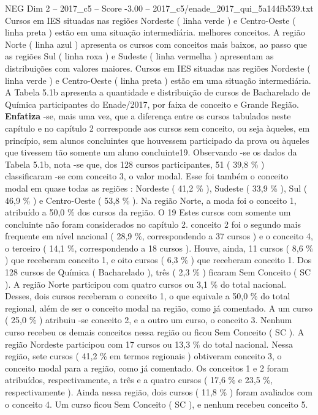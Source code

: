 \begin{textsample}{NEG Dim 2 – 2017\_c5 – Score -3.00 – 2017\_c5/enade\_2017\_qui\_5a144fb539.txt}
Cursos em IES situadas nas regiões Nordeste ( linha verde ) e Centro-Oeste ( linha preta ) estão em uma situação intermediária. melhores conceitos.
A região Norte ( linha azul ) apresenta os cursos com conceitos mais baixos, ao passo que as regiões Sul ( linha roxa ) e Sudeste ( linha vermelha ) apresentam as distribuições com valores maiores.
Cursos em IES situadas nas regiões Nordeste ( linha verde ) e Centro-Oeste ( linha preta ) estão em uma situação intermediária.
A Tabela 5.1b apresenta a quantidade e distribuição de cursos de Bacharelado de Química participantes do Enade/2017, por faixa de conceito e Grande Região. \textbf{Enfatiza} -se, mais uma vez, que a diferença entre os cursos tabulados neste capítulo e no capítulo 2 corresponde aos cursos sem conceito, ou seja àqueles, em princípio, sem alunos concluintes que houvessem participado da prova ou àqueles que tivessem tão somente um aluno concluinte19.
Observando -se os dados da Tabela 5.1b, nota -se que, dos 128 cursos participantes, 51 ( 39,8 \% ) classificaram -se com conceito 3, o valor modal.
Esse foi também o conceito modal em quase todas as regiões : Nordeste ( 41,2 \% ), Sudeste ( 33,9 \% ), Sul ( 46,9 \% ) e Centro-Oeste ( 53,8 \% ).
Na região Norte, a moda foi o conceito 1, atribuído a 50,0 \% dos cursos da região.
O 19 Estes cursos com somente um concluinte não foram considerados no capítulo 2. conceito 2 foi o segundo mais frequente em nível nacional ( 28,9 \%, correspondendo a 37 cursos ) e o conceito 4, o terceiro ( 14,1 \%, correspondendo a 18 cursos ).
Houve, ainda, 11 cursos ( 8,6 \% ) que receberam conceito 1, e oito cursos ( 6,3 \% ) que receberam conceito 1.
Dos 128 cursos de Química ( Bacharelado ), três ( 2,3 \% ) ficaram Sem Conceito ( SC ).
A região Norte participou com quatro cursos ou 3,1 \% do total nacional.
Desses, dois cursos receberam o conceito 1, o que equivale a 50,0 \% do total regional, além de ser o conceito modal na região, como já comentado.
A um curso ( 25,0 \% ) atribuiu -se conceito 2, e a outro um curso, o conceito 3.
Nenhum curso recebeu os demais conceitos nessa região ou ficou Sem Conceito ( SC ).
A região Nordeste participou com 17 cursos ou 13,3 \% do total nacional.
Nessa região, sete cursos ( 41,2 \% em termos regionais ) obtiveram conceito 3, o conceito modal para a região, como já comentado.
Os conceitos 1 e 2 foram atribuídos, respectivamente, a três e a quatro cursos ( 17,6 \% e 23,5 \%, respectivamente ).
Ainda nessa região, dois cursos ( 11,8 \% ) foram avaliados com o conceito 4.
Um curso ficou Sem Conceito ( SC ), e nenhum recebeu conceito 5.

\end{textsample}
